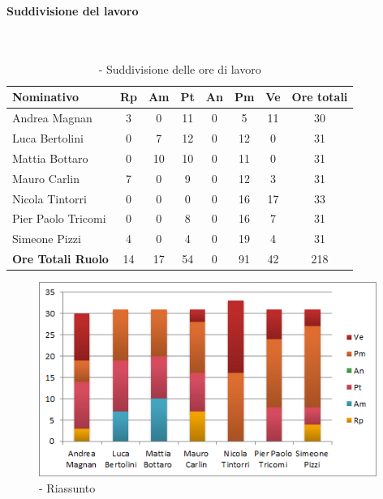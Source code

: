 \documentclass[./PianoDiProgetto.tex]{subfiles}
\begin{document}
	\subsubsection{\PerC}
				\paragraph{Suddivisione del lavoro}\

	\begin{table}[H]
		\begin{tabularx}{\textwidth}{l  * {6}{c}  c}
			\toprule
			\textbf{Nominativo} & \textbf{Rp} & \textbf{Am} & \textbf{Pt}
						& \textbf{An} & \textbf{Pm} & \textbf{Ve} & \textbf{Ore totali} \\
			\midrule
			Andrea Magnan  & 3 & 0 & 11 & 0 & 5 & 11 & 30 \\
			Luca Bertolini  & 0 & 7 & 12 & 0 & 12 & 0 & 31 \\
			Mattia Bottaro  & 0 & 10 & 10 & 0 & 11 & 0 & 31 \\
			Mauro Carlin  & 7 & 0 & 9 & 0 & 12 & 3 & 31 \\
			Nicola Tintorri  & 0 & 0 & 0 & 0 & 16 & 17 & 33 \\
			Pier Paolo Tricomi  & 0 & 0 & 8 & 0 & 16 & 7 & 31 \\
			Simeone Pizzi & 4 & 0 & 4 & 0 & 19 & 4 & 31 \\
			\midrule
			\textbf{Ore Totali Ruolo} & 14 & 17 & 54 & 0 & 91 & 42 & 218 \\
			\bottomrule

		\end{tabularx}
		\caption{\PerC{} - Suddivisione delle ore di lavoro}
	\end{table}

\vfill

	\begin{figure}[H]
		\centering
		\includegraphics[width=11cm, trim=1cm 0cm 1cm 0cm]{grafici/C-persona}
			\caption{\PerC{}- Riassunto}
	\end{figure}
\vfill
\end{document}
